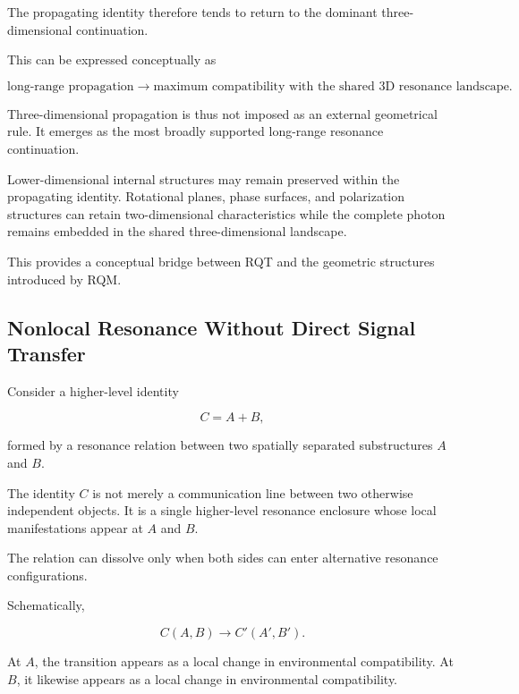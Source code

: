 \documentclass[11pt,a4paper]{article}
\begin{document}
The propagating identity therefore tends to return to the dominant three-dimensional continuation.

This can be expressed conceptually as

\begin{equation}
    \text{long-range propagation}
    \rightarrow
    \text{maximum compatibility with the shared 3D resonance landscape}.
\end{equation}

Three-dimensional propagation is thus not imposed as an external geometrical rule. It emerges as the most broadly supported long-range resonance continuation.

Lower-dimensional internal structures may remain preserved within the propagating identity. Rotational planes, phase surfaces, and polarization structures can retain two-dimensional characteristics while the complete photon remains embedded in the shared three-dimensional landscape.

This provides a conceptual bridge between RQT and the geometric structures introduced by RQM.


\subsection{Nonlocal Resonance Without Direct Signal Transfer}
\label{sec:nonlocal_resonance_no_signal}

Consider a higher-level identity

\begin{equation}
    C=A+B,
\end{equation}

formed by a resonance relation between two spatially separated substructures $A$ and $B$.

The identity $C$ is not merely a communication line between two otherwise independent objects. It is a single higher-level resonance enclosure whose local manifestations appear at $A$ and $B$.

The relation can dissolve only when both sides can enter alternative resonance configurations.

Schematically,

\begin{equation}
    C(A,B)
    \rightarrow
    C'(A',B').
\end{equation}

At $A$, the transition appears as a local change in environmental compatibility. At $B$, it likewise appears as a local change in environmental compatibility.
\end{document}
